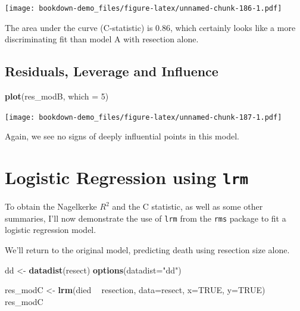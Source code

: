 \documentclass[]{book}
\newenvironment{Shaded}{\begin{snugshade}}{\end{snugshade}}
\newcommand{\KeywordTok}[1]{\textcolor[rgb]{0.13,0.29,0.53}{\textbf{#1}}}
\newcommand{\DataTypeTok}[1]{\textcolor[rgb]{0.13,0.29,0.53}{#1}}
\newcommand{\DecValTok}[1]{\textcolor[rgb]{0.00,0.00,0.81}{#1}}
\newcommand{\StringTok}[1]{\textcolor[rgb]{0.31,0.60,0.02}{#1}}
\newcommand{\OtherTok}[1]{\textcolor[rgb]{0.56,0.35,0.01}{#1}}
\newcommand{\OperatorTok}[1]{\textcolor[rgb]{0.81,0.36,0.00}{\textbf{#1}}}
\newcommand{\NormalTok}[1]{#1}
\theoremstyle{definition}
\theoremstyle{definition}
\theoremstyle{definition}
\theoremstyle{remark}
\begin{document}
\texttt{[image: bookdown-demo\_files/figure-latex/unnamed-chunk-186-1.pdf]}

The area under the curve (C-statistic) is 0.86, which certainly looks
like a more discriminating fit than model A with resection alone.

\subsection{Residuals, Leverage and
Influence}\label{residuals-leverage-and-influence}

\begin{Shaded}
\begin{Highlighting}[]
\KeywordTok{plot}\NormalTok{(res_modB, }\DataTypeTok{which =} \DecValTok{5}\NormalTok{)}
\end{Highlighting}
\end{Shaded}

\texttt{[image: bookdown-demo\_files/figure-latex/unnamed-chunk-187-1.pdf]}

Again, we see no signs of deeply influential points in this model.

\section{\texorpdfstring{Logistic Regression using
\texttt{lrm}}{Logistic Regression using lrm}}\label{logistic-regression-using-lrm}

To obtain the Nagelkerke \(R^2\) and the C statistic, as well as some
other summaries, I'll now demonstrate the use of \texttt{lrm} from the
\texttt{rms} package to fit a logistic regression model.

We'll return to the original model, predicting death using resection
size alone.

\begin{Shaded}
\begin{Highlighting}[]
\NormalTok{dd <-}\StringTok{ }\KeywordTok{datadist}\NormalTok{(resect)}
\KeywordTok{options}\NormalTok{(}\DataTypeTok{datadist=}\StringTok{"dd"}\NormalTok{)}

\NormalTok{res_modC <-}\StringTok{ }\KeywordTok{lrm}\NormalTok{(died }\OperatorTok{~}\StringTok{ }\NormalTok{resection, }\DataTypeTok{data=}\NormalTok{resect, }\DataTypeTok{x=}\OtherTok{TRUE}\NormalTok{, }\DataTypeTok{y=}\OtherTok{TRUE}\NormalTok{)}
\NormalTok{res_modC}
\end{Highlighting}
\end{Shaded}
\end{document}

